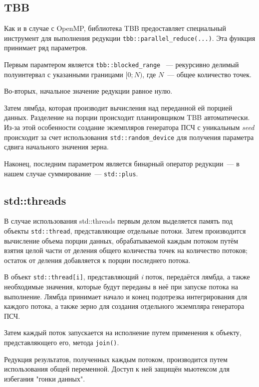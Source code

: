 \documentclass{report}
\begin{document}
\subsection*{TBB}
Как и в случае с OpenMP, библиотека TBB предоставляет специальный инструмент для выполнения редукции \verb|tbb::parallel_reduce(...)|.  Эта функция принимает ряд параметров. 
\par Первым парамтером является \verb|tbb::blocked_range| ~--- рекурсивно делимый полуинтервал с указанными границами $[0; N)$, где $N$~--- общее количество точек.
\par Во-вторых, начальное значение редукции равное нулю.
\par Затем лямбда, которая производит вычисления над переданной ей порцией данных. Разделение на порции происходит планировщиком TBB автоматически. Из-за этой особенности создание экземпляров генератора ПСЧ с уникальным \emph{seed} происходит за счет использования \verb|std::random_device| для получения параметра сдвига начального значения зерна.
\par Наконец, последним параметром является бинарный оператор редукции~--- в нашем случае суммирование~--- \verb|std::plus|.

\subsection*{std::threads}
В случае использования std::threads первым делом выделяется память под объекты \verb|std::thread|, представляющие отдельные потоки. Затем производится вычисление объема порции данных, обрабатываемой каждым потоком путём взятия целой части от деления общего количества точек на количество потоков; остаток от деления добавляется к порции последнего потока.
\par В объект \verb|std::thread[i]|, представляющий \emph{i} поток, передаётся лямбда, а также необходимые значения, которые будут переданы в неё при запуске потока на выполнение. Лямбда принимает начало и конец подотрезка интегрирования для каждого потока, а также зерно для создания отдельного экземпляра генератора ПСЧ.
\par Затем каждый поток запускается на исполнение путем применения к объекту, представляющего его, метода \verb|join()|.
\par Редукция результатов, полученных каждым потоком, производится путем использования общей переменной. Доступ к ней защищён мьютексом для избегания "гонки данных".
\newpage
\end{document}
